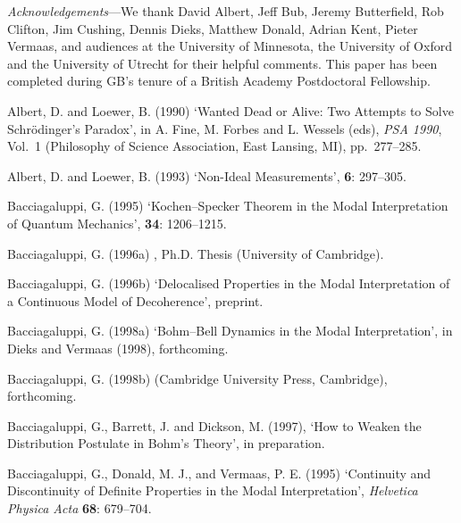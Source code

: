 \documentclass[12pt]{article}
\begin{document}
{\em Acknowledgements}---We thank David Albert, Jeff Bub, Jeremy 
Butterfield, Rob Clifton, Jim Cushing, Dennis Dieks, Matthew Donald, 
Adrian Kent, Pieter Vermaas, and audiences at the University of 
Minnesota, the University of Oxford and the University of Utrecht for 
their helpful comments.  This paper has been completed during GB's 
tenure of a British Academy Postdoctoral Fellowship.


\newpage 


\begin{thebibliography}{10}

Albert, D. and Loewer, B. (1990)
\newblock `Wanted Dead or Alive:  Two Attempts to Solve Schr\"odinger's
Paradox',
\newblock in A. Fine, M. Forbes and L. Wessels (eds), {\em
PSA 1990}, Vol.~1 (Philosophy of Science Association, East Lansing, MI),
\mbox{pp. 277--285}.

Albert, D. and Loewer, B. (1993)
\newblock `Non-Ideal Measurements',
 {\bf 6}: 297--305.

Bacciagaluppi, G. (1995)
\newblock `Kochen--Specker Theorem in the Modal Interpretation of
Quantum Mechanics',
 {\bf
34}: 1206--1215.

Bacciagaluppi, G. (1996a)
,
\newblock Ph.D. Thesis (University of Cambridge).

Bacciagaluppi, G. (1996b)
\newblock `Delocalised Properties in the Modal Interpretation of a
Continuous Model of Decoherence',
\newblock preprint.

Bacciagaluppi, G. (1998a)
\newblock `Bohm--Bell Dynamics in the Modal Interpretation',
\newblock in Dieks and Vermaas (1998), forthcoming.

Bacciagaluppi, G. (1998b)
(Cambridge University Press, Cambridge), forthcoming.

Bacciagaluppi, G., Barrett, J. and Dickson, M. (1997),
\newblock `How to Weaken the Distribution Postulate in Bohm's Theory',
\newblock in preparation.

Bacciagaluppi, G., Donald, M. J., and Vermaas, P. E. (1995)
\newblock `Continuity and Discontinuity of Definite Properties in the
Modal Interpretation', {\it Helvetica Physica Acta} {\bf 68}: 679--704.


\end{thebibliography}
\end{document}
